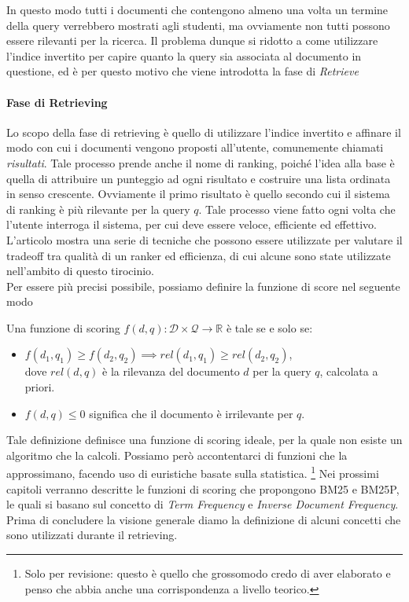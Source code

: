 In questo modo tutti i documenti che contengono almeno una volta un termine della query verrebbero mostrati
agli studenti, ma ovviamente non tutti possono essere rilevanti per la ricerca. Il problema dunque si ridotto
a come utilizzare l'indice invertito per capire quanto la query sia associata al documento in questione, ed è per questo
motivo che viene introdotta la fase di \textit{Retrieve}

\paragraph{Fase di Retrieving}
Lo scopo della fase di retrieving è quello di utilizzare l'indice invertito e affinare il modo con cui
i documenti vengono proposti all'utente, comunemente chiamati \textit{risultati}.
Tale processo prende anche il nome di ranking, poiché l'idea alla base è quella di attribuire
un punteggio ad ogni risultato e costruire una lista ordinata in senso crescente.
Ovviamente il primo risultato è quello secondo cui il sistema di ranking è più
rilevante per la query $q$. Tale processo viene fatto ogni volta che l'utente
interroga il sistema, per cui deve essere veloce, efficiente ed effettivo.
L'articolo \cite{10.1016/j.ipm.2016.05.004} mostra una serie di tecniche che possono essere
utilizzate per valutare il tradeoff tra qualità di un ranker ed efficienza, di cui alcune
sono state utilizzate nell'ambito di questo tirocinio.\\
Per essere più precisi possibile, possiamo definire la funzione di score nel seguente modo

\begin{definizione}\label{def:funzione_di_score_ideale}
	 Una funzione di scoring $f(d,q) : \mathcal{D} \times \mathcal{Q} \rightarrow \mathbb{R}$ è tale
	 se e solo se:
	 \begin{itemize}
	 	\item $f(d_1,q_1) \geq f(d_2, q_2) \implies rel(d_1, q_1) \geq rel(d_2, q_2)$,\\ dove $rel(d,q)$ è la rilevanza del documento $d$ per la query $q$, calcolata a priori.
	 	\item $f(d,q) \leq 0$ significa che il documento è irrilevante per $q$.
	 \end{itemize}
\end{definizione}

Tale definizione definisce una funzione di scoring ideale, per la quale non esiste un algoritmo che
la calcoli. Possiamo però accontentarci di funzioni che la approssimano, facendo uso di euristiche basate sulla statistica. \footnote{Solo per revisione: questo è quello che grossomodo credo di aver elaborato e penso che abbia anche una corrispondenza a livello teorico. }
Nei prossimi capitoli verranno descritte le funzioni di scoring che propongono BM25 e BM25P, le quali si basano sul concetto di \textit{Term Frequency} e \textit{Inverse Document Frequency}.
Prima di concludere la visione generale diamo la definizione di alcuni concetti che sono utilizzati durante il retrieving.

